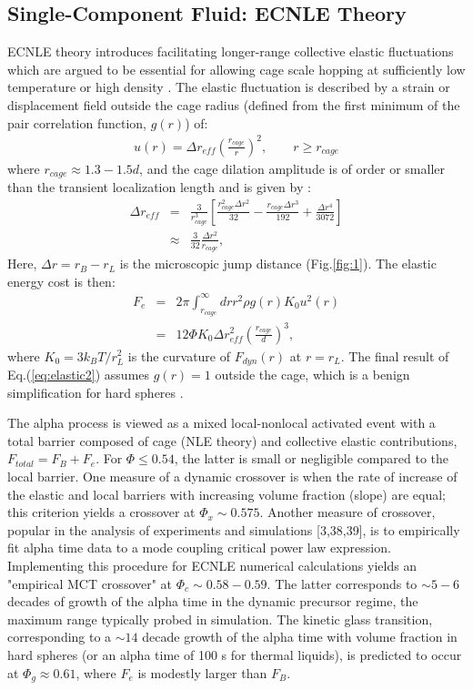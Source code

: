 \documentclass[twocolumn,showpacs,preprintnumbers,amsmath,amssymb,unsortedaddress,
]{revtex4-1}
\begin{document}
\subsection{Single-Component Fluid: ECNLE Theory}
ECNLE theory introduces facilitating longer-range collective elastic fluctuations which are argued to be essential for allowing cage scale hopping at sufficiently low temperature or high density \cite{7,11,30}. The elastic fluctuation is described by a strain or displacement field outside the cage radius (defined from the first minimum of the pair correlation function, $g(r)$) of:
\begin{eqnarray}
u(r) = \Delta r_{eff}\left(\frac{r_{cage}}{r}\right)^2, \qquad r \geq r_{cage}
\label{eq:elastic1}
\end{eqnarray}
where $r_{cage}\approx 1.3-1.5d$, and the cage dilation amplitude is of order or smaller than the transient localization length and is given by \cite{7,30}:
\begin{eqnarray}
\Delta r_{eff} &=& \frac{3}{r_{cage}^3}\left[\frac{r_{cage}^2\Delta r^2}{32}-\frac{r_{cage}\Delta r^3}{192}+\frac{\Delta r^4}{3072} \right] \nonumber\\ 
&\approx& \frac{3}{32}\frac{\Delta r^2}{r_{cage}},
\label{eq:effective}
\end{eqnarray}
Here, $\Delta r = r_B - r_L$ is the microscopic jump distance (Fig.\ref{fig:1}). The elastic energy cost is then:
\begin{eqnarray}
F_e &=& 2\pi\int_{r_{cage}}^\infty dr r^2\rho g(r) K_0 u^2(r) \nonumber\\
 &=& 12\Phi K_0\Delta r_{eff}^2\left(\frac{r_{cage}}{d}\right)^3,
\label{eq:elastic2}
\end{eqnarray}
where $K_0 = 3k_BT/r_L^2$ is the curvature of $F_{dyn}(r)$ at $r = r_L$. The final result of Eq.(\ref{eq:elastic2}) assumes $g(r) = 1$ outside the cage, which is a benign simplification for hard spheres \cite{7}. 

The alpha process is viewed as a mixed local-nonlocal activated event with a total barrier composed of cage (NLE theory) and collective elastic contributions, $F_{total} = F_B + F_e$. For $\Phi \leq 0.54$, the latter is small or negligible compared to the local barrier. One measure of a dynamic crossover is when the rate of increase of the elastic and local barriers with increasing volume fraction (slope) are equal; this criterion yields \cite{7} a crossover at $\Phi_x\sim 0.575$. Another measure of crossover, popular in the analysis of experiments and simulations [3,38,39], is to empirically fit alpha time data to a mode coupling critical power law expression. Implementing this procedure for ECNLE numerical calculations yields \cite{7} an "empirical MCT crossover" at $\Phi_c\sim 0.58-0.59$. The latter corresponds to $\sim 5-6$ decades of growth of the alpha time in the dynamic precursor regime, the maximum range typically probed in simulation. The kinetic glass transition, corresponding to a $\sim 14$ decade growth of the alpha time with volume fraction in hard spheres (or an alpha time of 100 s for thermal liquids), is predicted \cite{8} to occur at $\Phi_g \approx 0.61$, where $F_e$ is modestly larger than $F_B$.
\end{document}
